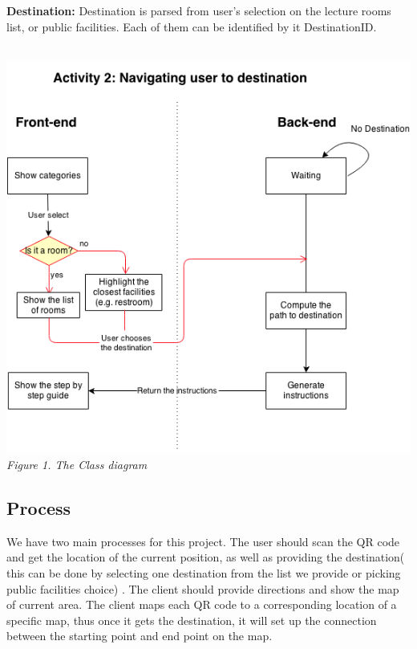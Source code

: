 \documentclass[12pt]{article}
\begin{document}
\textbf{Destination:}
Destination is parsed from user’s selection on the lecture rooms list, or public facilities. Each of them can be identified by it DestinationID.\\ \\


\begin{center}
\includegraphics[scale=0.6]{image/image02.png}
\\
\textit{Figure 1. The Class diagram}
\end{center}
\subsection{Process}
We have two main processes for this project. The user should scan the QR code and get the location of the current position, as well as providing the destination( this can be done by selecting one destination from the list we provide or picking public facilities choice)  . The client should provide directions and show the map of current area. The client maps each QR code to a corresponding location of a specific map, thus once it gets the destination, it will set up the connection between the starting point and end point on the map. 
\end{document}
